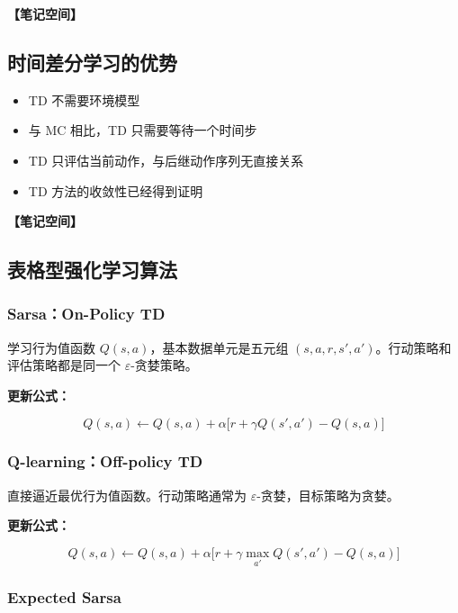 \documentclass[12pt,a4paper]{article}
\newcommand{\notespace}[1][3cm]{%
  \vspace{#1}%
  \noindent\textbf{【笔记空间】}%
  \vspace{#1}%
}
\newcommand{\1}{\mathbf{1}}
\begin{document}
\notespace[2cm]

\subsection{时间差分学习的优势}

\begin{itemize}[leftmargin=2em]
  \item TD 不需要环境模型
  \item 与 MC 相比，TD 只需要等待一个时间步
  \item TD 只评估当前动作，与后继动作序列无直接关系
  \item TD 方法的收敛性已经得到证明
\end{itemize}

\notespace[2cm]

\subsection{表格型强化学习算法}

\subsubsection*{Sarsa：On-Policy TD}

学习行为值函数 $Q(s,a)$，基本数据单元是五元组 $(s,a,r,s',a')$。行动策略和评估策略都是同一个 $\varepsilon$-贪婪策略。

\textbf{更新公式：}

\begin{equation}
Q(s,a)\leftarrow Q(s,a)+\alpha\bigl[r+\gamma Q(s',a')-Q(s,a)\bigr]
\end{equation}

\subsubsection*{Q-learning：Off-policy TD}

直接逼近最优行为值函数。行动策略通常为 $\varepsilon$-贪婪，目标策略为贪婪。

\textbf{更新公式：}

\begin{equation}
Q(s,a)\leftarrow Q(s,a)+\alpha\bigl[r+\gamma \max_{a'}Q(s',a')-Q(s,a)\bigr]
\end{equation}

\subsubsection*{Expected Sarsa}
\end{document}
